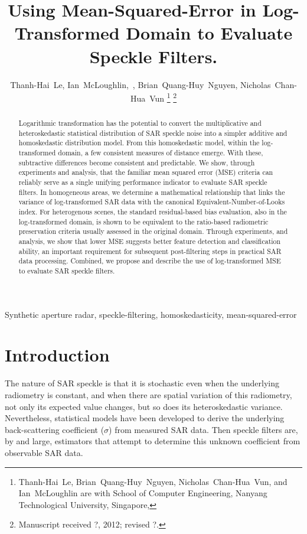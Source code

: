 \documentclass[journal]{IEEEtran}
\title{ 
	Using Mean-Squared-Error in Log-Transformed Domain to Evaluate Speckle Filters.
}
\author{Thanh-Hai~Le,
        Ian~McLoughlin,~\IEEEmembership{Senior Member,~IEEE}, 
	Brian~Quang-Huy~Nguyen,
	Nicholas~Chan-Hua~Vun%
\thanks{Thanh-Hai~Le, Brian~Quang-Huy~Nguyen, Nicholas~Chan-Hua~Vun, and Ian~McLoughlin are with School of Computer Engineering, 
Nanyang Technological University, Singapore,}%
\thanks{Manuscript received ?, 2012; revised ?.}}
\begin{document}
\maketitle

\begin{abstract}

Logarithmic transformation has the potential to convert 
	the multiplicative and heteroskedastic statistical distribution of SAR speckle noise into 
	a simpler additive and homoskedastic distribution model.
From this homoskedastic model, within the log-transformed domain, 
	a few consistent measures of distance emerge.
With these, subtractive differences become consistent and predictable. 
We show, through experiments and analysis, that 
	the familiar mean squared error (MSE) criteria can reliably serve 
		as a single unifying performance indicator to evaluate SAR speckle filters. 
In homogeneous areas, we determine a mathematical relationship that links the variance of log-transformed SAR data with the canonical Equivalent-Number-of-Looks index.
For heterogenous scenes, the standard residual-based bias evaluation, also in the log-transformed domain, 
	is shown to be equivalent to the ratio-based radiometric preservation criteria usually assessed in the original domain. 
Through experiments, and analysis, we show that lower MSE suggests better feature detection and classification ability, an important requirement for subsequent post-filtering steps in practical SAR data processing.
Combined, we propose and describe the use of log-transformed MSE to evaluate SAR speckle filters.

\end{abstract}

\begin{IEEEkeywords}
Synthetic aperture radar, speckle-filtering, homoskedasticity, mean-squared-error
\end{IEEEkeywords}

\IEEEpeerreviewmaketitle

\section{Introduction}

The nature of SAR speckle is that
	it is stochastic even when the underlying radiometry is constant, 
	and when there are spatial variation of this radiometry, not only its expected value changes, but so does its heteroskedastic variance.
Nevertheless, statistical models have been developed to derive the underlying back-scattering coefficient ($\sigma$) from measured SAR data. 
Then speckle filters are, by and large, estimators that attempt to determine this unknown coefficient from observable SAR data. 
\end{document}
